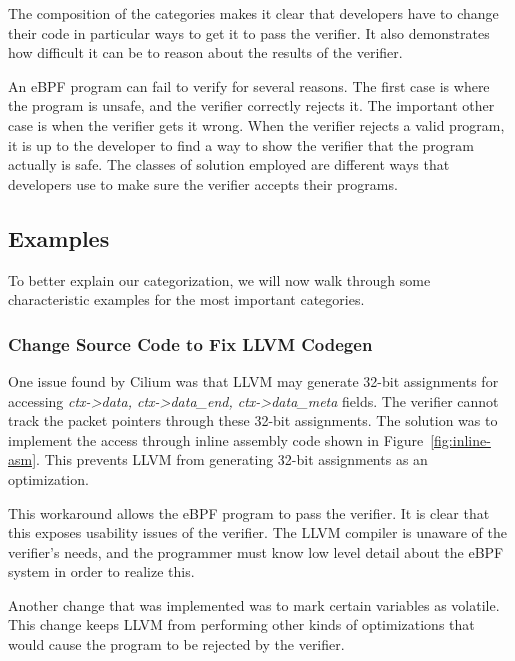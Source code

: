 The composition of the categories makes it clear that developers have to change their code in particular ways to get it to pass the verifier.
It also demonstrates how difficult it can be to reason about the results of the verifier.

An eBPF program can fail to verify for several reasons.
The first case is where the program is unsafe, and the verifier correctly rejects it.
The important other case is when the verifier gets it wrong.
When the verifier rejects a valid program, it is up to the developer to find a way to show the verifier that the program actually is safe.
The classes of solution employed are different ways that developers use to make sure the verifier accepts their programs.

\subsection{Examples}
To better explain our categorization, we will now walk through some characteristic examples for the most important categories.

\subsubsection{Change Source Code to Fix LLVM Codegen}
One issue found by Cilium was that LLVM may generate 32-bit assignments for accessing \emph{ctx->data, ctx->data\_end, ctx->data\_meta} fields.
The verifier cannot track the packet pointers through these 32-bit assignments.
The solution was to implement the access through inline assembly code shown in Figure~\ref{fig:inline-asm}.
This prevents LLVM from generating 32-bit assignments as an optimization.



This workaround allows the eBPF program to pass the verifier.
It is clear that this exposes usability issues of the verifier.
The LLVM compiler is unaware of the verifier's needs, and the programmer must know low level detail about the eBPF system in order to realize this.

Another change that was implemented was to mark certain variables as volatile.
This change keeps LLVM from performing other kinds of optimizations that would cause the program to be rejected by the verifier.

